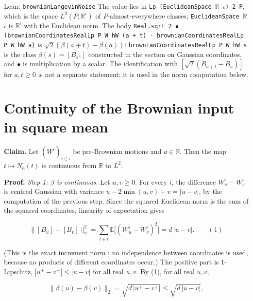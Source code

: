 \documentclass[11pt,a4paper]{article}
\begin{document}
\begin{leanbox}{Lean: \texttt{brownianLangevinNoise}}
The value lies in \texttt{Lp (Euclidean\allowbreak{}Space \ensuremath{\mathbb R} \ensuremath{\iota}) 2 P}, which is the space \(L^2(P;\mathbb R^\iota)\) of \(P\)-almost-everywhere classes; \texttt{Euclidean\allowbreak{}Space \ensuremath{\mathbb R} \ensuremath{\iota}} is \(\mathbb R^\iota\) with the Euclidean norm. The body \texttt{Real.\allowbreak{}sqrt 2 \ensuremath{\bullet} (brownian\allowbreak{}Coordinates\allowbreak{}Real\allowbreak{}Lp P W h\allowbreak{}W (a + t) -\allowbreak{} brownian\allowbreak{}Coordinates\allowbreak{}Real\allowbreak{}Lp P W h\allowbreak{}W a)} is \(\sqrt2(\beta(a+t)-\beta(a))\): \texttt{brownian\allowbreak{}Coordinates\allowbreak{}Real\allowbreak{}Lp P W h\allowbreak{}W s} is the class \(\beta(s)=[B_{s^+}]\) constructed in the section on Gaussian coordinates, and \texttt{\ensuremath{\bullet}} is multiplication by a scalar. The identification with \([\sqrt2(B_{a+t}-B_a)]\) for \(a,t\ge0\) is not a separate statement; it is used in the norm computation below.
\end{leanbox}

\section{\texorpdfstring{Continuity of the Brownian input in square mean}{Continuity of the Brownian input in square mean}}


\textbf{Claim.} Let \((W^i)_{i\in\iota}\) be pre-Brownian motions and \(a\in\mathbb R\). Then the map \(t\mapsto N_a(t)\) is continuous from \(\mathbb R\) to \(L^2\).




\textbf{Proof.} \emph{Step 1: \(\beta\) is continuous.} Let \(u,v\ge0\). For every \(i\), the difference \(W^i_u-W^i_v\) is centred Gaussian with variance \(u-2\min(u,v)+v=|u-v|\), by the computation of the previous step. Since the squared Euclidean norm is the sum of the squared coordinates, linearity of expectation gives


\[\bigl\|[B_u]-[B_v]\bigr\|_2^2=\sum_{i\in\iota}\mathbb E\bigl[(W^i_u-W^i_v)^2\bigr]=d\,|u-v|.\qquad(1)\]


(This is the exact increment norm \cite[Section~3.24.17]{LangevinLean2026ULASC}; no independence between coordinates is used, because no products of different coordinates occur.) The positive part is \(1\)-Lipschitz, \(|u^+-v^+|\le|u-v|\) for all real \(u,v\). By (1), for all real \(u,v\),


\[\|\beta(u)-\beta(v)\|_2=\sqrt{d\,|u^+-v^+|}\le\sqrt{d\,|u-v|},\]
\end{document}
